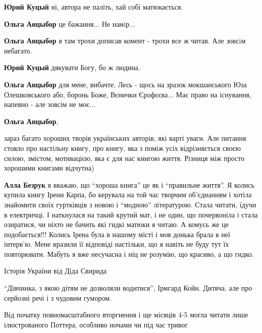 \begin{itemize}
\begin{itemize} %
\textbf{Юрий Куцый} ні, автора не паліть, хай собі матюкається.

\textbf{Ольга Анцыбор} це бажання... Не намiр... 🙂

\textbf{Ольга Анцыбор} я там трохи дописав комент - трохи все ж читав. Але зовсiм небагато.

\textbf{Юрий Куцый} дякувати Богу, бо ж людина.

\textbf{Ольга Анцыбор} для мене, вибачте, Лесь - щось на зразок мокшанського Юза Олешковського або, боронь Боже, Вєнички Єрофєєва... Має право на існування, напевно - але зовсім не моє...
\end{itemize} %

\textbf{Ольга Анцыбор}, 

зараз багато хороших творів українських авторів, які варті уваги. Але питання
стояло про настільну книгу, про книгу, яка з поміж усіх відрізняється своєю
силою, змістом, мотивацією, яка є для нас книгою життя. Різниця між просто
хорошими книгами відчутна)

\begin{itemize} %
\textbf{Алла Безрук} я вважаю, що \enquote{хороша книга} це як і \enquote{правильне життя}. Я
колись купила книгу Ірени Карпа, бо керувала на той час творчим об'єднанням і
хотіла знайомити своїх гуртківців з новою і \enquote{модною} літературою. Стала
читати, їдучи в електричці. І наткнулася на такий крутий мат, і не один, що
почервоніла і стала озиратися, чи ніхто не бачить які гидкі матюки я читаю. А
комусь же це подобається!!! Колись Ірена була в нашому місті і моя донька брала
в неї інтерв'ю. Мене вразили її відповіді настільки, що я навіть не буду тут їх
повторювати. Мабуть я вже несучасна і ніц не розумію, що красиво, а що гидко.
\end{itemize} %

\end{itemize} %


Історія України від Діда Свирида


\enquote{Дівчинка, з якою дітям не дозволяли водитися}, Ірмгард Койн. Дитяча, але про серйозні речі і з чудовим гумором.


Від початку повномасштабного вторгнення і ще місяців 4-5 могла читати лише
ілюстрованого Поттера, особливо ночами чи під час тривог

